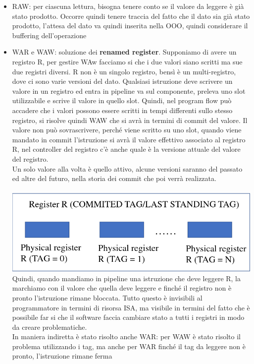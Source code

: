 \documentclass[14pt]{article}
\begin{document}
\begin{itemize}
\item RAW: per ciascuna lettura, bisogna tenere conto se il valore da leggere è già stato prodotto. Occorre quindi tenere traccia del fatto che il dato sia già stato prodotto, l'attesa del dato va quindi inserita nella OOO, quindi considerare il buffering dell'operazione
\item WAR e WAW: soluzione dei \textbf{renamed register}. Supponiamo di avere un registro R, per gestire WAw facciamo si che i due valori siano scritti ma sue due registri diversi. R non è un singolo registro, bensì è un multi-registro, dove ci sono varie versioni del dato. Qualsiasi istruzione deve scrivere un valore in un registro ed entra in pipeline va sul componente, preleva uno slot utilizzabile e scrive il valore in quello slot. Quindi, nel program flow può accadere che i valori possono essere scritti in tempi differenti sullo stesso registro, si risolve quindi WAW che si avrà in termini di commit del valore. Il valore non può sovrascrivere, perché viene scritto su uno slot, quando viene mandato in commit l'istruzione si avrà il valore effettivo associato al registro R, nel controller del registro c'è anche quale è la versione attuale del valore del registro.\\ Un solo valore alla volta è quello attivo, alcune versioni saranno del passato ed altre del futuro, nella storia dei commit che poi verrà realizzata.\\\\
\includegraphics[scale=0.25]{immagini/multi-registri}\\
Quindi, quando mandiamo in pipeline una istruzione che deve leggere R, la marchiamo con il valore che quella deve leggere e finché il registro non è pronto l'istruzione rimane bloccata. Tutto questo è invisibili al programmatore in termini di risorsa ISA, ma visibile in termini del fatto che è possibile far si che il software faccia cambiare stato a tutti i registri in modo da creare problematiche.\\ In maniera indiretta è stato risolto anche WAR: per WAW è stato risolto il problema utilizzando i tag, ma anche per WAR finché il tag da leggere non è pronto, l'istruzione rimane ferma
\end{itemize}
\end{document}
